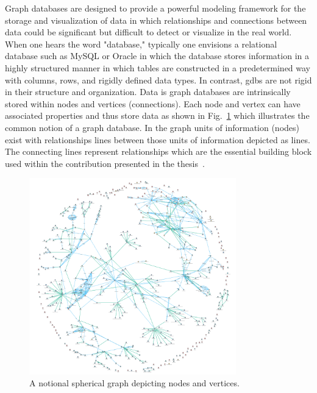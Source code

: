 Graph databases are designed to provide a powerful modeling framework for the storage and visualization of data in which relationships and connections between data could be significant but difficult to detect or visualize in the real world.  When one hears the word "database," typically one envisions a relational database such as MySQL or Oracle in which the database stores information in a highly structured manner in which tables are constructed in a predetermined way with columns, rows, and rigidly defined data types.  In contrast, \glspl{gdb} are not rigid in their structure and organization.  Data is graph databases are intrinsically stored within nodes and vertices (connections).  Each node and vertex can have associated properties and thus store data as shown in Fig.~\ref{fig:concl:graphdb-sperical} which illustrates the common notion of a graph database.  In the graph units of information (nodes) exist with relationships lines between those units of information depicted as lines.  The connecting lines represent relationships which are the essential building block used within the contribution presented in the thesis~\cite{CandellISIT2020.Conf}.  

\begin{figure}[!ht]
	\centering
	\includegraphics[width=0.8\textwidth]{chapter-conclusions/images/spherical-graph.png}
	\caption{A notional spherical graph depicting nodes and vertices.}
	\label{fig:concl:graphdb-sperical}
\end{figure}

